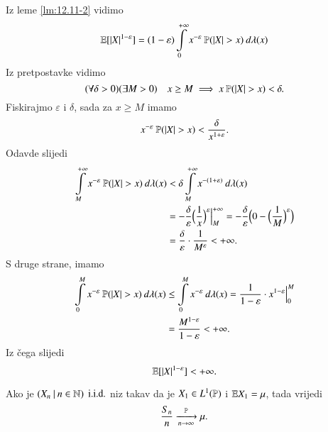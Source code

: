 \begin{rj}[\ref{zad:12.13}]
    Iz leme \ref{lm:12.11-2} vidimo
    \begin{equation*}
            \mathbb{E} [|X|^{1-\varepsilon}] = (1 - \varepsilon) \int\limits_{0}^{+\infty} x^{-\varepsilon} \: \mathbb{P} (|X| > x) \: d \lambda (x)
    \end{equation*}
    Iz pretpostavke vidimo
    \begin{equation*}
        (\forall \delta > 0) (\exists M > 0) \quad x \geq M \implies x \: \mathbb{P} (|X| > x) < \delta.
    \end{equation*}
    Fiskirajmo $\varepsilon$ i $\delta$, sada za $x \geq M$ imamo
    \begin{equation*}
        x^{-\varepsilon} \: \mathbb{P} (|X| > x) < \frac{\delta}{x^{1 + \varepsilon}}.
    \end{equation*}
    Odavde slijedi
    \begin{equation*}
        \begin{aligned}
            \int\limits_{M}^{+\infty} x^{-\varepsilon} \: \mathbb{P} (|X| > x) \: d \lambda (x) &< \delta \int\limits_{M}^{+\infty} x^{-(1 + \varepsilon)} \: d \lambda (x)\\
            &= -\frac{\delta}{\varepsilon} \Big( \frac{1}{x} \Big)^{\varepsilon} \Big|_{M}^{+\infty} = - \frac{\delta}{\varepsilon} \Big(0 - \Big( \frac{1}{M} \Big)^\varepsilon \Big)\\
            &= \frac{\delta}{\varepsilon} \cdot \frac{1}{M^\varepsilon} < +\infty.
        \end{aligned} 
    \end{equation*}
    S druge strane, imamo
    \begin{equation*}
        \begin{aligned}
            \int\limits_{0}^{M} x^{-\varepsilon} \: \mathbb{P} (|X| > x) \: d \lambda (x) &\leq \int\limits_{0}^{M} x^{-\varepsilon} \: d \lambda (x) = \frac{1}{1 - \varepsilon} \cdot x^{1 - \varepsilon} \Big|_0^M\\
            &= \frac{M^{1 - \varepsilon}}{1 - \varepsilon} < +\infty.
        \end{aligned}
    \end{equation*}
    Iz \v cega slijedi
    \begin{equation*}
        \mathbb{E} [|X|^{1 - \varepsilon}] < +\infty.
    \end{equation*}
\end{rj}

\begin{kor} \label{kor:12.14}
    Ako je $({X_n} \: | \: {n \in \mathbb{N}})$ $\mathrm{i.i.d.}$ niz takav da je $X_1 \in L^1(\mathbb{P})$ i $\mathbb{E} X_1 = \mu$, tada vrijedi
    \begin{equation*}
        \frac{S_n}{n} \xrightarrow[n \to \infty]{\mathbb{P}} \mu.
    \end{equation*}
\end{kor}


